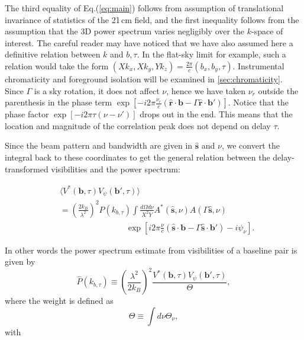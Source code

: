 \documentclass[twocolumn,apj,numberedappendix]{emulateapj}
\renewcommand\[{\begin{equation}}
\renewcommand\]{\end{equation}}
\begin{document}
The third equality of Eq.(\ref{eq:main}) follows from assumption of translational invariance of statistics of the 21\,cm field, and the first inequality follows from the assumption that
the 3D power spectrum varies negligibly over the $k$-space of interest. The careful reader may have noticed that we have also assumed here a definitive relation between $k$ and $b,\tau$. In the flat-sky limit for example, such a relation would take the form $(Xk_{x},Xk_{y},Yk_{z})=\frac{2\pi}{c}(b_{x},b_{y},\tau)$. Instrumental chromaticity and foreground isolation will be examined in \ref{sec:chromaticity}. Since $\Gamma$
is a sky rotation, it does not affect $\nu$, hence we have taken $\nu_{r}$
outside the parenthesis in the phase term $\exp\left[-i2\pi\frac{\nu_{r}}{c}\left(\hat{\boldsymbol{r}}\cdot\boldsymbol{b}-\Gamma \hat{\boldsymbol{r}}\cdot\boldsymbol{b'}\right)\right]$. Notice that the phase factor $\exp\left[-i2\pi\tau\left(\nu-\nu'\right)\right]$
drops out in the end. This means that the location and magnitude of the correlation peak does not depend on delay $\tau$. 

Since the beam pattern and bandwidth are given in $\hat{\boldsymbol{s}}$
and $\nu$, we convert the integral back to these coordinates to get
the general relation between the delay-transformed visibilities and
the power spectrum:

\begin{equation}
\begin{aligned} & \langle V^{*}(\boldsymbol{b},\tau)V_{\psi}(\boldsymbol{b'},\tau)\rangle\\
 & =\left(\frac{2k_{B}}{\lambda^{2}}\right)^{2}P(k_{b,\tau})\int\frac{d\Omega d\nu}{X^{2}Y}A^{*}(\hat{\boldsymbol{s}},\nu)A(\Gamma\hat{\boldsymbol{s}},\nu)\\
 & \qquad \qquad \qquad \qquad \exp\left[i2\pi\frac{\nu}{c}\left(\hat{\boldsymbol{s}}\cdot\boldsymbol{b}-\Gamma\hat{\boldsymbol{s}}\cdot\boldsymbol{b'}\right)-i\psi_{\nu}\right].
 \end{aligned}
\label{eq:final}
\end{equation}

In other words the power spectrum estimate from visibilities of a baseline pair is given by 
\begin{equation}
 \hat{P}(k_{b,\tau}) \equiv \left(\frac{\lambda^{2}}{2k_{B}}\right)^{2} \frac{V^{*}(\boldsymbol{b},\tau)V_{\psi}(\boldsymbol{b'},\tau)}{\Theta}, 
 \label{eq:opp}
\end{equation}
where the weight is defined as 
\begin{equation}
\Theta \equiv\int d\nu \Theta_{\nu}, 
\label{eq:Theta}
\end{equation}
with  
\end{document}
